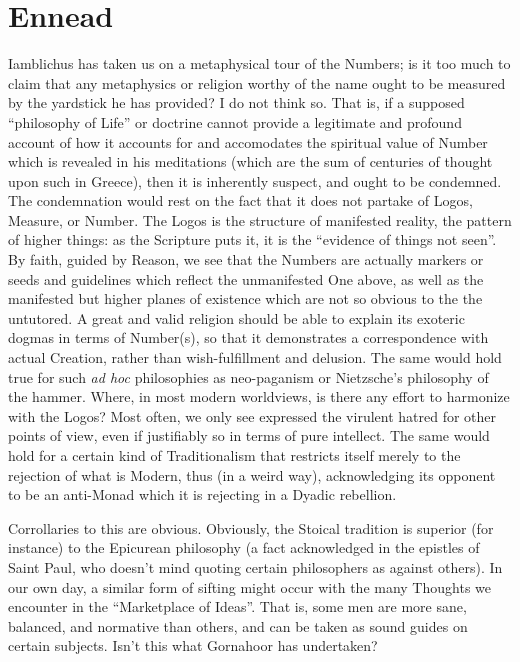 \section{Ennead}

Iamblichus has taken us on a metaphysical tour of the Numbers; is it too much to claim that any metaphysics or religion worthy of the name ought to be measured by the yardstick he has provided? I do not think so. That is, if a supposed ``philosophy of Life'' or doctrine cannot provide a legitimate and profound account of how it accounts for and accomodates the spiritual value of Number which is revealed in his meditations (which are the sum of centuries of thought upon such in Greece), then it is inherently suspect, and ought to be condemned. The condemnation would rest on the fact that it does not partake of Logos, Measure, or Number. The Logos is the structure of manifested reality, the pattern of higher things: as the Scripture puts it, it is the ``evidence of things not seen''. By faith, guided by Reason, we see that the Numbers are actually markers or seeds and guidelines which reflect the unmanifested One above, as well as the manifested but higher planes of existence which are not so obvious to the the untutored. A great and valid religion should be able to explain its exoteric dogmas in terms of Number(s), so that it demonstrates a correspondence with actual Creation, rather than wish-fulfillment and delusion. The same would hold true for such
\emph{ad hoc} philosophies as neo-paganism or Nietzsche's philosophy of the hammer. Where, in most modern worldviews, is there any effort to harmonize with the Logos? Most often, we only see expressed the virulent hatred for other points of view, even if justifiably so in terms of pure intellect. The same would hold for a certain kind of Traditionalism that restricts itself merely to the rejection of what is Modern, thus (in a weird way), acknowledging its opponent to be an anti-Monad which it is rejecting in a Dyadic rebellion.

Corrollaries to this are obvious. Obviously, the Stoical tradition is superior (for instance) to the Epicurean philosophy (a fact acknowledged in the epistles of Saint Paul, who doesn't mind quoting certain philosophers as against others). In our own day, a similar form of sifting might occur with the many Thoughts we encounter in the ``Marketplace of Ideas''. That is, some men are more sane, balanced, and normative than others, and can be taken as sound guides on certain subjects. Isn't this what Gornahoor has undertaken?


